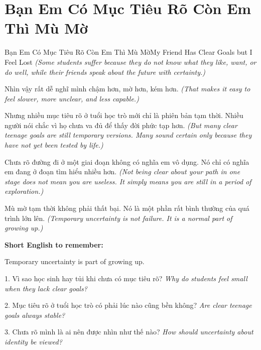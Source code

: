 \section{Bạn Em Có Mục Tiêu Rõ Còn Em Thì Mù Mờ}
\begin{truyen}{Bạn Em Có Mục Tiêu Rõ Còn Em Thì Mù Mờ}{My Friend Has Clear Goals but I Feel Lost}
\textit{(Some students suffer because they do not know what they like, want, or do well, while their friends speak about the future with certainty.)}

Nhìn vậy rất dễ nghĩ mình chậm hơn, mờ hơn, kém hơn.
\textit{(That makes it easy to feel slower, more unclear, and less capable.)}

Nhưng nhiều mục tiêu rõ ở tuổi học trò mới chỉ là phiên bản tạm thời. Nhiều người nói chắc vì họ chưa va đủ để thấy đời phức tạp hơn.
\textit{(But many clear teenage goals are still temporary versions. Many sound certain only because they have not yet been tested by life.)}

Chưa rõ đường đi ở một giai đoạn không có nghĩa em vô dụng. Nó chỉ có nghĩa em đang ở đoạn tìm hiểu nhiều hơn.
\textit{(Not being clear about your path in one stage does not mean you are useless. It simply means you are still in a period of exploration.)}
\end{truyen}

\begin{baihoc}
Mù mờ tạm thời không phải thất bại. Nó là một phần rất bình thường của quá trình lớn lên.
\textit{(Temporary uncertainty is not failure. It is a normal part of growing up.)}
\end{baihoc}

\begin{ghinhoanh}
\textbf{Short English to remember:}

Temporary uncertainty is part of growing up.

\end{ghinhoanh}

\begin{tuhocnhanh}
1. Vì sao học sinh hay tủi khi chưa có mục tiêu rõ? \textit{Why do students feel small when they lack clear goals?}

2. Mục tiêu rõ ở tuổi học trò có phải lúc nào cũng bền không? \textit{Are clear teenage goals always stable?}

3. Chưa rõ mình là ai nên được nhìn như thế nào? \textit{How should uncertainty about identity be viewed?}
\end{tuhocnhanh}
\ngancach

